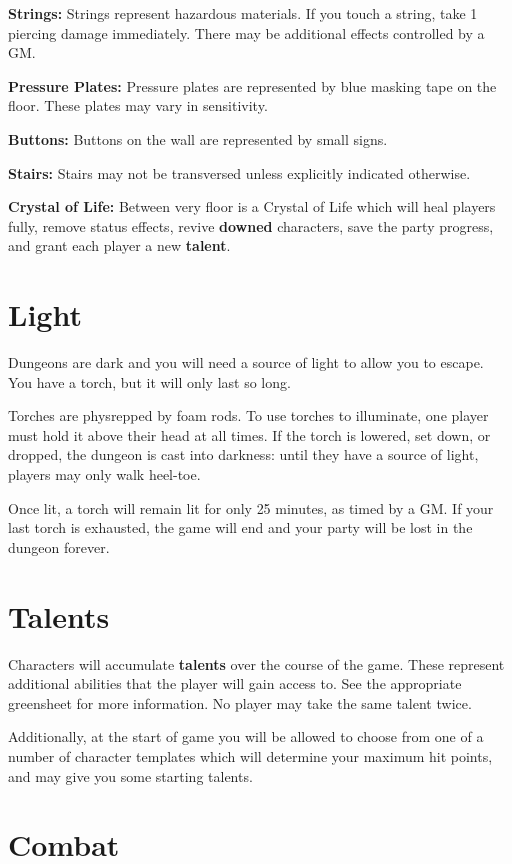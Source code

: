 \documentclass[green]{grimrock}
\begin{document}
{\bf Strings:} Strings represent hazardous materials.  If you touch a string, take 1 piercing damage immediately.  There may be additional effects controlled by a GM.

{\bf Pressure Plates:} Pressure plates are represented by blue masking tape on the floor.  These plates may vary in sensitivity.

{\bf Buttons:} Buttons on the wall are represented by small signs.

{\bf Stairs:} Stairs may not be transversed unless explicitly indicated otherwise.

{\bf Crystal of Life:}  Between very floor is a Crystal of Life which will heal players fully, remove status effects, revive {\bf downed} characters, save the party progress, and grant each player a new {\bf talent}.

\section{Light}

Dungeons are dark and you will need a source of light to allow you to escape.  You have a torch, but it will only last so long.

Torches are physrepped by foam rods.  To use torches to illuminate, one player must hold it above their head at all times.  If the torch is lowered, set down, or dropped, the dungeon is cast into darkness: until they have a source of light, players may only walk heel-toe.

Once lit, a torch will remain lit for only 25 minutes, as timed by a GM.  If your last torch is exhausted, the game will end and your party will be lost in the dungeon forever.

\section{Talents}

Characters will accumulate {\bf talents} over the course of the game.  These represent additional abilities that the player will gain access to.  See the appropriate greensheet for more information.  No player may take the same talent twice.

Additionally, at the start of game you will be allowed to choose from one of a number of character templates which will determine your maximum hit points, and may give you some starting talents.

\section{Combat}
\end{document}
